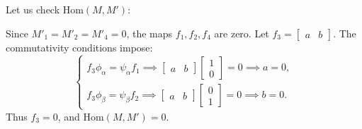 \documentclass[11pt, a4paper]{report}
\begin{document}
\begin{example}
    Let us check $\mathrm{Hom}(M,M')$:
    \begin{center}
    \end{center}

    Since $M'_1=M'_2=M'_4=0$, the maps $f_1, f_2, f_4$ are zero. Let $f_3 = \begin{bmatrix} a & b \end{bmatrix}$. The commutativity conditions impose:
    \[
        \begin{cases}
            f_3 \phi_\alpha = \psi_\alpha f_1 \implies \begin{bmatrix} a & b \end{bmatrix} \begin{bmatrix} 1 \\ 0 \end{bmatrix} = 0 \implies a = 0, \\
            f_3 \phi_\beta = \psi_\beta f_2 \implies \begin{bmatrix} a & b \end{bmatrix} \begin{bmatrix} 0 \\ 1 \end{bmatrix} = 0 \implies b = 0.
        \end{cases}
    \]
    Thus $f_3 = 0$, and $\mathrm{Hom}(M, M') = 0$.


\end{example}
\end{document}
